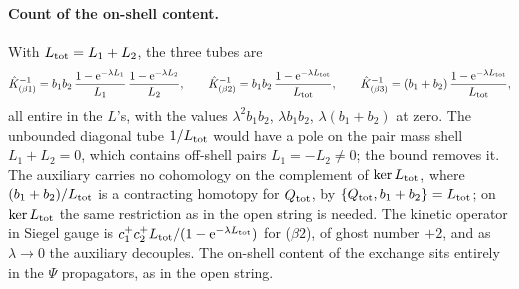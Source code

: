 \paragraph{Count of the on-shell content.}
With $L_{\rm tot} = L_1 + L_2$, the three tubes are
\begin{equation}
  \label{eq:ch9:tubes}
  \hat K^{-1}_{(\beta 1)}
    = b_1 b_2 \, \frac{1 - \mathrm{e}^{- \lambda L_1}}{L_1} \, \frac{1 - \mathrm{e}^{- \lambda L_2}}{L_2},
  \qquad
  \hat K^{-1}_{(\beta 2)}
    = b_1 b_2 \, \frac{1 - \mathrm{e}^{- \lambda L_{\rm tot}}}{L_{\rm tot}},
  \qquad
  \hat K^{-1}_{(\beta 3)}
    = (b_1 + b_2) \, \frac{1 - \mathrm{e}^{- \lambda L_{\rm tot}}}{L_{\rm tot}},
\end{equation}
all entire in the $L$'s, with the values $\lambda^2 b_1 b_2$, $\lambda b_1 b_2$, $\lambda (b_1 + b_2)$ at zero.
The unbounded diagonal tube $1 / L_{\rm tot}$ would have a pole on the pair mass shell $L_1 + L_2 = 0$, which contains off-shell pairs $L_1 = - L_2 \neq 0$; the bound removes it.
The auxiliary carries no cohomology on the complement of $\ker L_{\rm tot}$, where $(b_1 + b_2) / L_{\rm tot}$ is a contracting homotopy for $Q_{\rm tot}$, by $\{ Q_{\rm tot}, b_1 + b_2 \} = L_{\rm tot}$; on $\ker L_{\rm tot}$ the same restriction as in the open string is needed.
The kinetic operator in Siegel gauge is $c_1^+ c_2^+ L_{\rm tot} / (1 - \mathrm{e}^{- \lambda L_{\rm tot}})$ for ($\beta 2$), of ghost number $+ 2$, and as $\lambda \to 0$ the auxiliary decouples.
The on-shell content of the exchange sits entirely in the $\Psi$ propagators, as in the open string.

